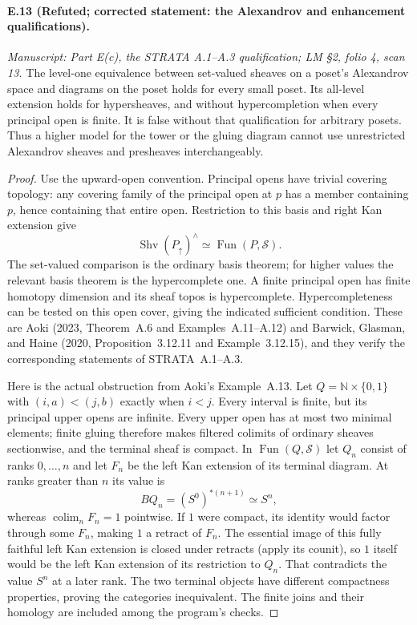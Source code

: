 \paragraph{E.13 (Refuted; corrected statement: the Alexandrov and enhancement qualifications).}
\textit{Manuscript: Part E(c), the STRATA A.1--A.3 qualification; LM \S2, folio 4, scan 13.}
The level-one equivalence between set-valued sheaves on a poset's Alexandrov space and diagrams on the poset holds for every small poset. Its all-level extension holds for hypersheaves, and without hypercompletion when every principal open is finite. It is false without that qualification for arbitrary posets. Thus a higher model for the tower or the gluing diagram cannot use unrestricted Alexandrov sheaves and presheaves interchangeably.
\begin{proof}
Use the upward-open convention. Principal opens have trivial covering topology: any covering family of the principal open at $p$ has a member containing $p$, hence containing that entire open. Restriction to this basis and right Kan extension give
\[
 \operatorname{Shv}(P_\uparrow)^{\wedge}
                  \simeq\operatorname{Fun}(P,\mathcal S).
                                                        \tag{E.13.1}
\]
The set-valued comparison is the ordinary basis theorem; for higher values the relevant basis theorem is the hypercomplete one. A finite principal open has finite homotopy dimension and its sheaf topos is hypercomplete. Hypercompleteness can be tested on this open cover, giving the indicated sufficient condition. These are Aoki (2023, Theorem~A.6 and Examples~A.11--A.12) and Barwick, Glasman, and Haine (2020, Proposition~3.12.11 and Example~3.12.15), and they verify the corresponding statements of STRATA~A.1--A.3.

Here is the actual obstruction from Aoki's Example~A.13. Let
$Q=\mathbb N\times\{0,1\}$ with $(i,a)<(j,b)$ exactly when $i<j$. Every interval is finite, but its principal upper opens are infinite. Every upper open has at most two minimal elements; finite gluing therefore makes filtered colimits of ordinary sheaves sectionwise, and the terminal sheaf is compact. In $\operatorname{Fun}(Q,\mathcal S)$ let $Q_n$ consist of ranks $0,\ldots,n$ and let $F_n$ be the left Kan extension of its terminal diagram. At ranks greater than $n$ its value is
\[
 BQ_n=(S^0)^{*(n+1)}\simeq S^n,
\]
whereas $\operatorname{colim}_nF_n=1$ pointwise. If $1$ were compact, its identity would factor through some $F_n$, making $1$ a retract of $F_n$. The essential image of this fully faithful left Kan extension is closed under retracts (apply its counit), so $1$ itself would be the left Kan extension of its restriction to $Q_n$. That contradicts the value $S^n$ at a later rank. The two terminal objects have different compactness properties, proving the categories inequivalent. The finite joins and their homology are included among the program's checks.


\end{proof}
